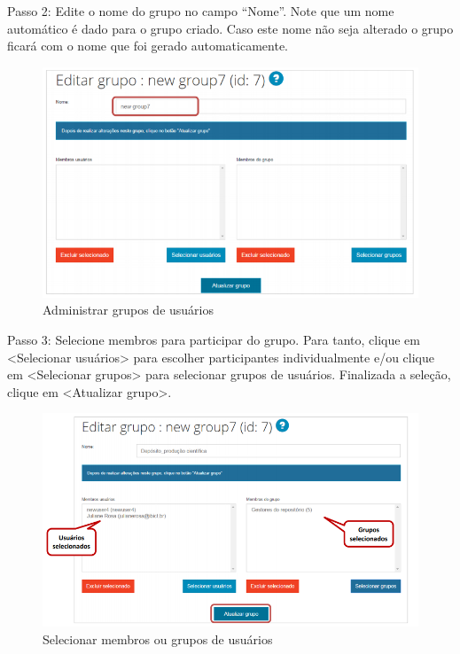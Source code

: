 \documentclass[12pt,hidelinks]{article}
\begin{document}
    Passo 2: Edite o nome do grupo no campo “Nome”. Note que um nome automático é dado para o grupo criado. Caso este nome não seja alterado o grupo ficará com o nome que foi gerado automaticamente.
    
    \begin{figure}[!htp]
                \centering
                \includegraphics[scale=0.8]{figura/Figura65.png}
                \caption{Administrar grupos de usuários}
            \label{Rotulo}
        \end{figure}
    
    Passo 3: Selecione membros para participar do grupo. Para tanto, clique em <Selecionar usuários> para escolher participantes individualmente e/ou clique em <Selecionar grupos> para selecionar grupos de usuários. Finalizada a seleção, clique em <Atualizar grupo>.
    
    \begin{figure}[!htp]
                \centering
                \includegraphics[scale=0.7]{figura/Figura66.png}
                \caption{Selecionar membros ou grupos de usuários}
            \label{Rotulo}
        \end{figure}
        
\end{document}
